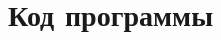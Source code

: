 \chapter*{Код программы}

\begin{lstlisting}[label=code1, caption = Лабораторная работа №3]
	
\end{lstlisting}